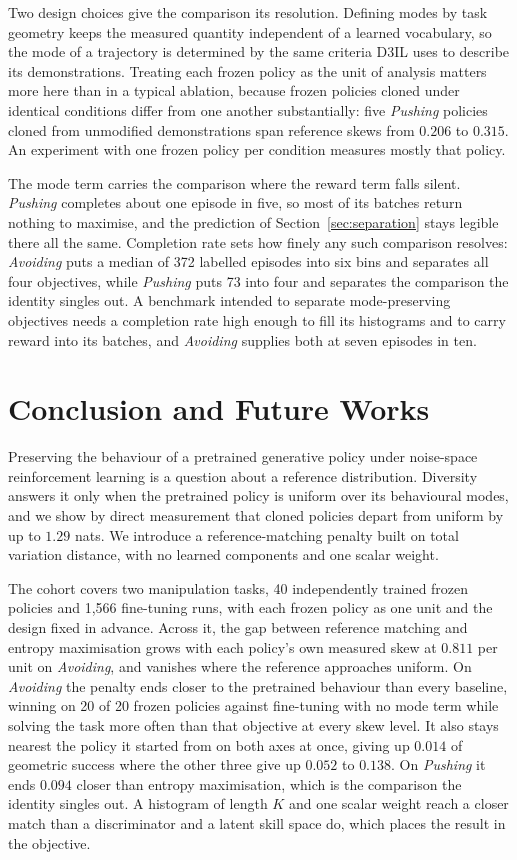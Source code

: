 \documentclass[preprint,12pt]{elsarticle}
\begin{document}
Two design choices give the comparison its resolution. Defining modes
by task geometry keeps the measured quantity independent of a learned
vocabulary, so the mode of a trajectory is determined by the same criteria D3IL
uses to describe its demonstrations. Treating each frozen policy as the unit of
analysis matters more here than in a typical ablation, because frozen policies
cloned under identical conditions differ from one another substantially: five
\emph{Pushing} policies cloned from unmodified demonstrations span reference
skews from $0.206$ to $0.315$. An experiment with one frozen policy per
condition measures mostly that policy.

The mode term carries the comparison where the reward term falls silent.
\emph{Pushing} completes about one episode in five, so most of its batches
return nothing to maximise, and the prediction of
Section~\ref{sec:separation} stays legible there all the same. Completion rate
sets how finely any such comparison resolves: \emph{Avoiding} puts a median of
372 labelled episodes into six bins and separates all four objectives, while
\emph{Pushing} puts 73 into four and separates the comparison the identity
singles out. A benchmark intended to separate mode-preserving objectives needs
a completion rate high enough to fill its histograms and to carry reward into
its batches, and \emph{Avoiding} supplies both at seven episodes in ten.

\section{Conclusion and Future Works}\label{sec:conclusion}

Preserving the behaviour of a pretrained generative policy under noise-space
reinforcement learning is a question about a reference distribution. Diversity
answers it only when the pretrained policy is uniform over its behavioural
modes, and we show by direct measurement that cloned policies depart from
uniform by up to $1.29$ nats. We introduce a reference-matching penalty built on
total variation distance, with no learned components and one scalar weight.

The cohort covers two manipulation tasks, 40 independently trained frozen
policies and 1,566 fine-tuning runs, with each frozen policy as one unit and
the design fixed in advance. Across it, the gap between reference matching and
entropy maximisation grows with each policy's own measured skew at $0.811$ per
unit on \emph{Avoiding}, and vanishes where the reference approaches uniform.
On \emph{Avoiding} the penalty ends closer to the pretrained behaviour than
every baseline, winning on 20 of 20 frozen policies against fine-tuning with no
mode term while solving the task more often than that objective at every skew
level. It also stays nearest the policy it started from on both axes at once, giving
up $0.014$ of geometric success where the other three give up $0.052$ to
$0.138$. On \emph{Pushing} it ends $0.094$ closer than entropy maximisation,
which is the comparison the identity singles out. A histogram of length $K$ and
one scalar weight reach a closer match than a discriminator and a latent skill
space do, which places the result in the objective.
\end{document}
